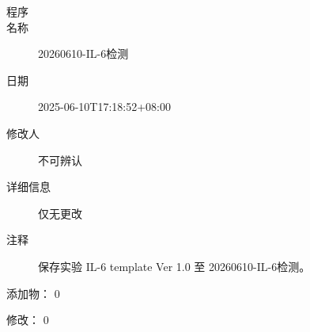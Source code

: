 \documentclass[UTF8,10pt,a4paper,fontset=fandol]{ctexart}
\newcommand{\fieldvalue}[1]{#1}
\begin{document}
\begin{description}
\item[程序]
\item[名称]%
\fieldvalue{20260610-IL-6检测}

\item[日期]%
\fieldvalue{2025-06-10T17:18:52+08:00}

\item[修改人]%
\fieldvalue{不可辨认}

\item[详细信息]%
\fieldvalue{仅无更改}

\item[注释]%
\fieldvalue{保存实验 IL-6 template Ver 1.0 至 20260610-IL-6检测。}
\end{description}

\noindent
添加物：%
\fieldvalue{0}

\par\noindent
修改：%
\fieldvalue{0}

\newpage
\end{document}
